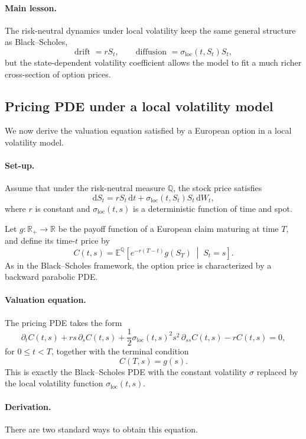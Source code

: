 \documentclass[11pt]{article}
\newcommand{\R}{\mathbb{R}}
\newcommand{\Qbb}{\mathbb{Q}}
\newcommand{\E}{\mathbb{E}}
\theoremstyle{plain}
\theoremstyle{definition}
\theoremstyle{remark}
\begin{document}
\paragraph{Main lesson.}
The risk-neutral dynamics under local volatility keep the same general
structure as Black--Scholes,
\[
\text{drift }=rS_t,
\qquad
\text{diffusion }=\sigma_{\mathrm{loc}}(t,S_t)S_t,
\]
but the state-dependent volatility coefficient allows the model to fit a
much richer cross-section of option prices.

\subsection{Pricing PDE under a local volatility model}

We now derive the valuation equation satisfied by a European option in a
local volatility model.

\paragraph{Set-up.}
Assume that under the risk-neutral measure \(\Qbb\), the stock price
satisfies
\[
\mathrm{d}S_t
=
rS_t\,\mathrm{d}t
+
\sigma_{\mathrm{loc}}(t,S_t)S_t\,\mathrm{d}W_t,
\]
where \(r\) is constant and \(\sigma_{\mathrm{loc}}(t,s)\) is a
deterministic function of time and spot. 

Let \(g:\R_+\to\R\) be the payoff function of a European claim maturing
at time \(T\), and define its time-\(t\) price by
\[
C(t,s)
=
\E^\Qbb\!\left[
e^{-r(T-t)}g(S_T)
\;\middle|\;
S_t=s
\right].
\]
As in the Black--Scholes framework, the option price is characterized by
a backward parabolic PDE. 

\paragraph{Valuation equation.}
The pricing PDE takes the form
\[
\boxed{
\partial_t C(t,s)
+
rs\,\partial_s C(t,s)
+
\frac12 \sigma_{\mathrm{loc}}(t,s)^2 s^2\,\partial_{ss}C(t,s)
-
rC(t,s)
=
0,
}
\]
for \(0\le t<T\), together with the terminal condition
\[
\boxed{
C(T,s)=g(s).
}
\]
This is exactly the Black--Scholes PDE with the constant volatility
\(\sigma\) replaced by the local volatility function
\(\sigma_{\mathrm{loc}}(t,s)\). 

\paragraph{Derivation.}
There are two standard ways to obtain this equation.
\end{document}
